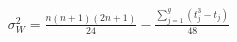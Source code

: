\documentclass[preview]{standalone}
\begin{document}
\begin{align*}
\sigma_W^2 = \frac{n(n+1)(2n+1)}{24} - \frac{\sum_{j=1}^{g} (t_j^3 - t_j)}{48}
\end{align*}
\end{document}
